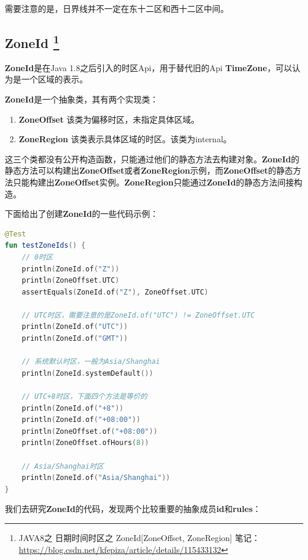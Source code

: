 \documentclass[cn,10pt,math=newtx,citestyle=gb7714-2015,bibstyle=gb7714-2015]{elegantbook}
\begin{document}
    \begin{note}
        需要注意的是，日界线并不一定在东十二区和西十二区中间。
    \end{note}

    \subsection{ZoneId
        \footnote{
            JAVA8之 日期时间时区之 ZoneId[ZoneOffset, ZoneRegion] 笔记：\url{https://blog.csdn.net/kfepiza/article/details/115433132}
        }
    }

    \textbf{ZoneId}是在Java 1.8之后引入的时区Api，用于替代旧的Api \textbf{TimeZone}，可以认为是一个区域的表示。

    \textbf{ZoneId}是一个抽象类，其有两个实现类：
    \begin{enumerate}
        \item \textbf{ZoneOffset} 该类为偏移时区，未指定具体区域。
        \item \textbf{ZoneRegion} 该类表示具体区域的时区。该类为internal。
    \end{enumerate}

    这三个类都没有公开构造函数，只能通过他们的静态方法去构建对象。\textbf{ZoneId}的静态方法可以构建出\textbf{ZoneOffset}或者\textbf{ZoneRegion}示例，而\textbf{ZoneOffset}的静态方法只能构建出\textbf{ZoneOffset}实例。\textbf{ZoneRegion}只能通过\textbf{ZoneId}的静态方法间接构造。

    下面给出了创建\textbf{ZoneId}的一些代码示例：

    \begin{lstlisting}[language=Kotlin]
@Test
fun testZoneIds() {
    // 0时区
    println(ZoneId.of("Z"))
    println(ZoneOffset.UTC)
    assertEquals(ZoneId.of("Z"), ZoneOffset.UTC)

    // UTC时区，需要注意的是ZoneId.of("UTC") != ZoneOffset.UTC
    println(ZoneId.of("UTC"))
    println(ZoneId.of("GMT"))
    
    // 系统默认时区，一般为Asia/Shanghai
    println(ZoneId.systemDefault())

    // UTC+8时区，下面四个方法是等价的
    println(ZoneId.of("+8"))
    println(ZoneId.of("+08:00"))
    println(ZoneOffset.of("+08:00"))
    println(ZoneOffset.ofHours(8))

    // Asia/Shanghai时区
    println(ZoneId.of("Asia/Shanghai"))
}
    \end{lstlisting}

    我们去研究\textbf{ZoneId}的代码，发现两个比较重要的抽象成员\textbf{id}和\textbf{rules}：
\end{document}
